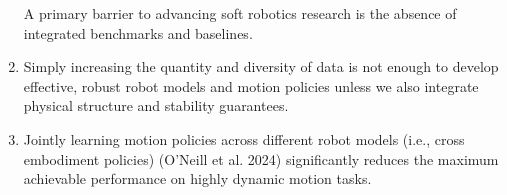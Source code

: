 \documentclass{propositions}
\begin{document}
\begin{enumerate}
    A primary barrier to advancing soft robotics research is the absence of integrated benchmarks and baselines.
    \item %
    Simply increasing the quantity and diversity of data is not enough to develop effective, robust robot models and motion policies unless we also integrate physical structure and stability guarantees.
    \item %
    Jointly learning motion policies across different robot models (i.e., cross embodiment policies) (O’Neill et al. 2024) significantly reduces the maximum achievable performance on highly dynamic motion tasks.

\end{enumerate}
\end{document}
